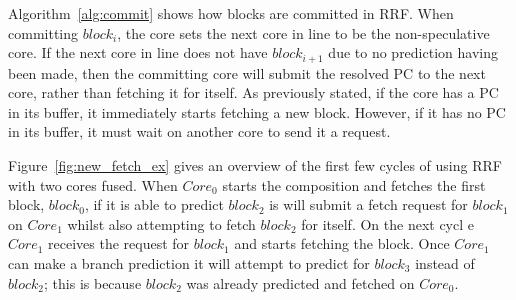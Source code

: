Algorithm~\ref{alg:commit} shows how blocks are committed in RRF.
When committing $block_i$, the core sets the next core in line to be the non-speculative core.
If the next core in line does not have $block_{i+1}$ due to no prediction having been made, then the committing core will submit the resolved PC to the next core, rather than fetching it for itself.
As previously stated, if the core has a PC in its buffer, it immediately starts fetching a new block.
However, if it has no PC in its buffer, it must wait on another core to send it a request.

	
Figure~\ref{fig:new_fetch_ex} gives an overview of the first few cycles of using RRF with two cores fused.
When $Core_0$ starts the composition and fetches the first block, $block_0$, if it is able to predict $block_2$ is will submit a fetch request for $block_1$ on $Core_1$ whilst also attempting to fetch $block_2$ for itself.
On the next cycl	e $Core_1$ receives the request for $block_1$ and starts fetching the block.
Once $Core_1$ can make a branch prediction it will attempt to predict for $block_3$ instead of $block_2$; this is because $block_2$ was already predicted and fetched on $Core_0$.




